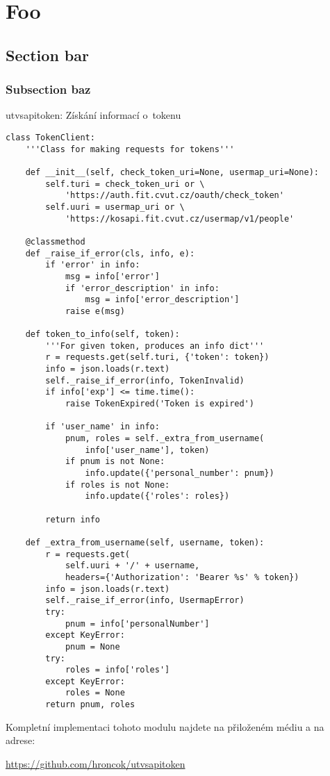\chapter{Foo \label{foo}}

\blind[2]

\section{Section bar}\label{bar}

\blind[2]

\subsection{Subsection baz}\label{baz}

\blind[2]

\begin{listing}[htbp]
\caption{\label{code:utvsapitoken}utvsapitoken: Získání informací o~tokenu}
\begin{verbatim}
class TokenClient:
    '''Class for making requests for tokens'''

    def __init__(self, check_token_uri=None, usermap_uri=None):
        self.turi = check_token_uri or \
            'https://auth.fit.cvut.cz/oauth/check_token'
        self.uuri = usermap_uri or \
            'https://kosapi.fit.cvut.cz/usermap/v1/people'

    @classmethod
    def _raise_if_error(cls, info, e):
        if 'error' in info:
            msg = info['error']
            if 'error_description' in info:
                msg = info['error_description']
            raise e(msg)

    def token_to_info(self, token):
        '''For given token, produces an info dict'''
        r = requests.get(self.turi, {'token': token})
        info = json.loads(r.text)
        self._raise_if_error(info, TokenInvalid)
        if info['exp'] <= time.time():
            raise TokenExpired('Token is expired')

        if 'user_name' in info:
            pnum, roles = self._extra_from_username(
                info['user_name'], token)
            if pnum is not None:
                info.update({'personal_number': pnum})
            if roles is not None:
                info.update({'roles': roles})

        return info

    def _extra_from_username(self, username, token):
        r = requests.get(
            self.uuri + '/' + username,
            headers={'Authorization': 'Bearer %s' % token})
        info = json.loads(r.text)
        self._raise_if_error(info, UsermapError)
        try:
            pnum = info['personalNumber']
        except KeyError:
            pnum = None
        try:
            roles = info['roles']
        except KeyError:
            roles = None
        return pnum, roles
\end{verbatim}
\end{listing}

Kompletní implementaci tohoto modulu najdete na přiloženém médiu a na adrese:

\url{https://github.com/hroncok/utvsapitoken}
